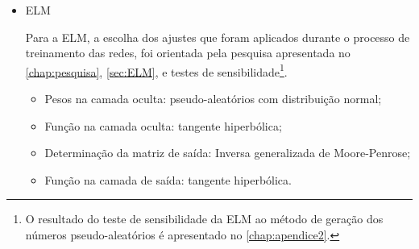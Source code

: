 \begin{itemize}
	\item ELM
	
	Para a ELM, a escolha dos ajustes que foram aplicados durante o processo de treinamento das redes, foi orientada pela pesquisa apresentada no \autoref{chap:pesquisa}, \autoref{sec:ELM}, e testes de sensibilidade\footnote{O resultado do teste de sensibilidade da ELM ao método de geração dos números pseudo-aleatórios é apresentado no \autoref{chap:apendice2}.}.
	\begin{itemize}
		\item Pesos na camada oculta: pseudo-aleatórios com distribuição normal;
		\item Função na camada oculta: tangente hiperbólica;
		\item Determinação da matriz de saída: Inversa generalizada de Moore-Penrose;
		\item Função na camada de saída: tangente hiperbólica.
	\end{itemize}
\end{itemize}


